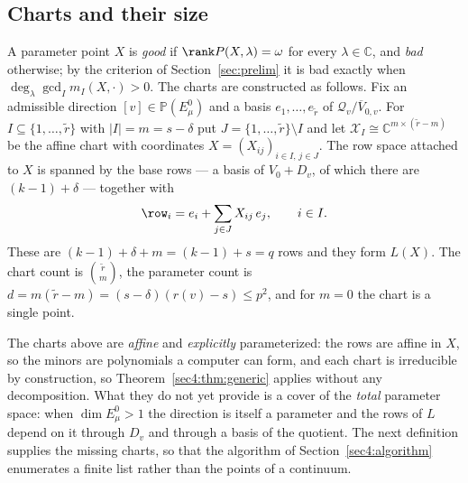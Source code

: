 \subsection{Charts and their size}
\label{sec4:charts}

\begin{defn}
\label{sec4:defn:goodbad}
\label{sec4:defn:charts}
A parameter point $X$ is \emph{good} if $\rank P(X,\lambda)=\omega$ for every $\lambda\in\mathbb C$,
and \emph{bad} otherwise; by the criterion of Section~\ref{sec:prelim} it is bad exactly when
$\deg_\lambda\gcd_I m_I(X,\cdot)>0$. The charts are constructed as follows. Fix an admissible direction
$[v]\in\mathbb P(E_\mu^0)$ and a basis $e_1,\dots,e_{\widetilde r}$ of
$\mathcal Q_v/\overline V_{0,v}$. For $I\subseteq\{1,\dots,\widetilde r\}$ with $|I|=m=s-\delta$ put
$J=\{1,\dots,\widetilde r\}\setminus I$ and let
$\mathcal X_I\cong\mathbb C^{m\times(\widetilde r-m)}$ be the affine chart with coordinates
$X=(X_{ij})_{i\in I,\,j\in J}$. The row space attached to $X$ is spanned by the base rows --- a basis
of $V_0+D_v$, of which there are $(k-1)+\delta$ --- together with
\[
\row_i=e_i+\sum_{j\in J}X_{ij}\,e_j,\qquad i\in I .
\]
These are $(k-1)+\delta+m=(k-1)+s=q$ rows and they form $L(X)$. The chart count is
$\binom{\widetilde r}{m}$, the parameter count is
$d=m(\widetilde r-m)=(s-\delta)(r(v)-s)\le p^2$, and for $m=0$ the chart is a single point.
\end{defn}

The charts above are \emph{affine} and \emph{explicitly} parameterized: the rows are affine in $X$, so
the minors are polynomials a computer can form, and each chart is irreducible by construction, so
Theorem~\ref{sec4:thm:generic} applies without any decomposition. What they do not yet provide is a
cover of the \emph{total} parameter space: when $\dim E_\mu^0>1$ the direction is itself a parameter and
the rows of $L$ depend on it through $D_v$ and through a basis of the quotient. The next definition
supplies the missing charts, so that the algorithm of Section~\ref{sec4:algorithm} enumerates a finite
list rather than the points of a continuum.

